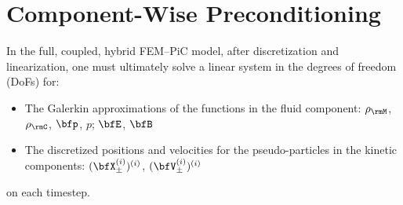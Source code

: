 \section{Component-Wise Preconditioning}
    In the full, coupled, hybrid FEM--PiC model, after discretization and linearization, one must ultimately solve a linear system in the degrees of freedom (DoFs) for:
    \begin{itemize}
        \item  The Galerkin approximations of the functions in the fluid component: $\rho_{\rmM}$, $\rho_{\rmC}$, $\bfp$, $p$; $\bfE$, $\bfB$
        \item  The discretized positions and velocities for the pseudo-particles in the kinetic components: $(\bfX_{\pm}^{(i)})^{(i)}$, $(\bfV_{\pm}^{(i)})^{(i)}$
    \end{itemize}
    on each timestep.

